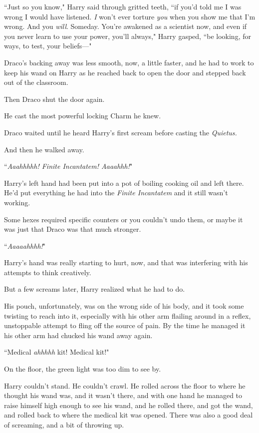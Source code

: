 ``Just so you know," Harry said through gritted teeth, ``if you'd told me I was wrong I would have listened. \emph{I} won't ever torture \emph{you} when you show me that I'm wrong. And you \emph{will}. Someday. You're awakened as a scientist now, and even if you never learn to use your power, you'll always," Harry gasped, ``be looking, for ways, to test, your beliefs—"

Draco's backing away was less smooth, now, a little faster, and he had to work to keep his wand on Harry as he reached back to open the door and stepped back out of the classroom.

Then Draco shut the door again.

He cast the most powerful locking Charm he knew.

Draco waited until he heard Harry's first scream before casting the \emph{Quietus.}

And then he walked away.

\later

``\emph{Aaahhhhh! Finite Incantatem! Aaaahhh!}"

Harry's left hand had been put into a pot of boiling cooking oil and left there. He'd put everything he had into the \emph{Finite Incantatem} and it still wasn't working.

Some hexes required specific counters or you couldn't undo them, or maybe it was just that Draco was that much stronger.

``\emph{Aaaaahhhh!}"

Harry's hand was really starting to hurt, now, and that was interfering with his attempts to think creatively.

But a few screams later, Harry realized what he had to do.

His pouch, unfortunately, was on the wrong side of his body, and it took some twisting to reach into it, especially with his other arm flailing around in a reflex, unstoppable attempt to fling off the source of pain. By the time he managed it his other arm had chucked his wand away again.

``Medical \emph{ahhhhh} kit! Medical kit!"

On the floor, the green light was too dim to see by.

Harry couldn't stand. He couldn't crawl. He rolled across the floor to where he thought his wand was, and it wasn't there, and with one hand he managed to raise himself high enough to see his wand, and he rolled there, and got the wand, and rolled back to where the medical kit was opened. There was also a good deal of screaming, and a bit of throwing up.

